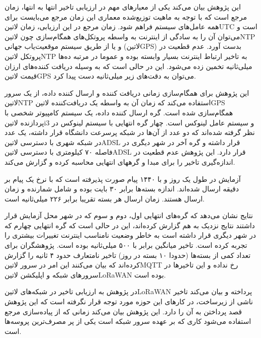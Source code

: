 این پژوهش بیان می‌کند یکی از معیارهای مهم در ارزیابی تاخیر انتها به انتها، زمان مرجع است که با توجه به ماهیت توزیع‌شده معماری این زمان مرجع می‌بایست برای همه عامل‌های
سیستم فراهم شود. زمان مرجع در این ارزیابی، زمان ‌لاتین{UTC} است و می‌توان آن را به سادگی از اینترنت به واسطه پروتکل‌های همگام‌سازی چون ‌لاتین{NTP}
و یا از طریق سیستم موقعیت‌یاب جهانی (‌لاتین{GPS}) بدست آورد.
عدم قطعیت در پروتکل ‌لاتین{NTP} به تاخیر ارتباط اینترنت بسیار وابسته بوده و عموما در مرتبه ده‌ها میلی‌ثانیه تخمین زده می‌شود.
این در حالی است که به وسیله دریافت کننده‌های ارزان قیمت ‌لاتین{GPS} می‌توان به دقت‌های زیر میلی‌ثانیه دست پیدا کرد.

این پژوهش برای همگام‌سازی زمانی دریافت کننده و ارسال کننده داده، از یک سرور ‌لاتین{NTP} استفاده می‌کند که زمان آن به واسطه یک دریافت‌کننده ‌لاتین{GPS} همگام‌سازی شده است.
گره ارسال کننده داده، یک سیستم کامپیوتر شخصی با پردازنده ‌لاتین{i3} و سیستم عامل لینوکس است. چهار گره انتهایی با سیستم لینوکس در نظر گرفته شده‌اند که دو عدد از آن‌ها در شبکه پرسرعت دانشگاه قرار داشته،
یک عدد در شبکه شهری با دسترسی ‌لاتین{ADSL} قرار داشته و گره آخر در شهر دیگری در فاصله ۷۰ کیلومتری با دسترسی ‌لاتین{ADSL} قرار دارد.
این پژوهش عدم قطعیت در اندازه‌گیری تاخیر را برای مبدا و گرههای انتهایی محاسبه کرده و گزارش می‌کند.

آزمایش در طول یک روز و با ۱۴۴۰ پیام صورت پذیرفته است که با نرخ یک پیام بر دقیقه ارسال شده‌اند.
اندازه بسته‌ها برابر ۳۰ بایت بوده و شامل شمارنده و زمان ارسال هستند.
زمان ارسال هر بسته تقریبا برابر ۲۲۶ میلی‌ثانیه است.

نتایج نشان می‌دهد که گره‌های انتهایی اول، دوم و سوم که در شهر محل آزمایش قرار داشتند نتایج نزدیک به هم گزارش کرده‌اند، این در حالی است که گره انتهایی چهارم
که در شهر دیگری قرار داشته است به خاطر وضعیت نامناسب اینترنت تغییرات بیشتری را تجربه کرده است.
تاخیر میانگین برابر با ۵۰۰ میلی‌ثانیه بوده است.
پژوهشگران برای تعداد کمی از بسته‌ها (حدودا ۱۰ بسته در روز) تاخیر نامتعارف حدود ۴ ثانیه را گزارش کرده‌اند که بیان می‌کنند این امر در سرور ‌لاتین{MQTT}
رخ نداده و این تاخیرها در سرورهای شبکه و اپلیکشن ‌لاتین{LoRaWAN} بوده است.



در پژوهش  به ارزیابی تاخیر در شبکه‌های ‌لاتین{LoRaWAN} پرداخته و بیان می‌کند تاخیر ناشی از زیرساخت، در کارهای این حوزه مورد توجه قرار نگرفته است
که این پژوهش قصد پرداختن به آن را دارد.
این پژوهش بیان می‌کند زمانی که از پیاده‌سازی مرجع استفاده می‌شود کاری که بر عهده سرور شبکه است یکی از پر مصرف‌ترین پروسه‌ها است.

